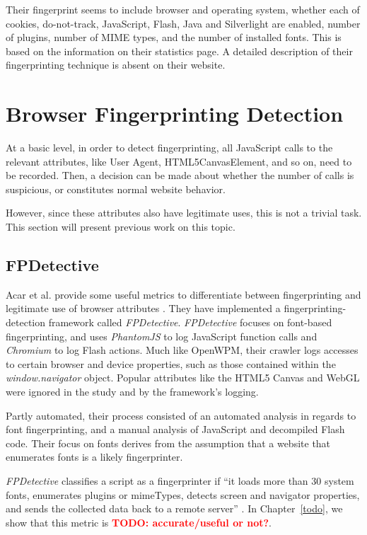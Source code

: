 \documentclass[
    fontsize=12pt,
    headings=small,
    parskip=half,
    bibliography=totoc,
    numbers=noenddot,
    open=any
    ]{scrreprt}
\newcommand{\todo}[1]{\textcolor{red}{\textbf{TODO: #1}}}
\begin{document}
Their fingerprint seems to include browser and operating system, whether each of cookies, do-not-track,
JavaScript, Flash, Java and Silverlight are enabled, number of plugins, number of MIME types,
and the number of installed fonts. This is based on the information on their statistics page.
A detailed description of their fingerprinting technique is absent on their website.

\section{Browser Fingerprinting Detection}
At a basic level, in order to detect fingerprinting, all JavaScript calls to the relevant attributes,
like User Agent, HTML5CanvasElement, and so on, need to be recorded. Then, a decision can be made about whether the number
of calls is suspicious, or constitutes normal website behavior.

However, since these attributes also have legitimate uses, this is not a trivial task.
This section will present previous work on this topic.


\subsection{FPDetective}
\label{related_work:fpdetective}
Acar et al. provide some useful metrics to differentiate between fingerprinting and legitimate use of
browser attributes \cite{DBLP:conf/ccs/AcarJNDGPP13}. They have implemented a fingerprinting-detection
framework called \textit{FPDetective}.
\textit{FPDetective} focuses on font-based fingerprinting, and uses
\textit{PhantomJS} to log JavaScript function calls and \textit{Chromium} to log Flash actions.
Much like OpenWPM, their crawler logs accesses to certain browser and device properties, such as
those contained within the \textit{window.navigator} object.
Popular attributes like the HTML5 Canvas and WebGL were ignored in the study and by the framework's logging.

Partly automated, their process consisted of an automated analysis in regards to font fingerprinting,
and a manual analysis of JavaScript and decompiled Flash code.
Their focus on fonts derives from the assumption that a website that
enumerates fonts is a likely fingerprinter.

\textit{FPDetective} classifies a script as a fingerprinter if ``it loads more than 30 system fonts, enumerates plugins
or mimeTypes, detects screen and navigator properties, and sends the collected data back to a remote server''
\cite{DBLP:conf/ccs/AcarJNDGPP13}.
In Chapter~\ref{todo}, we show that this metric is \todo{accurate/useful or not?}.
\end{document}
